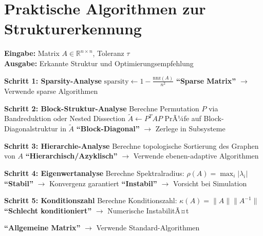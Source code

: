 ﻿\documentclass[a4paper,12pt]{report}
\theoremstyle{definition}
\begin{document}
	\section{Praktische Algorithmen zur Strukturerkennung}
	
	\begin{algorithm}[H]
		\caption{Automatische Strukturerkennung}
		\label{alg:structure-detection}
		\textbf{Eingabe:} Matrix $A \in \mathbb{R}^{n \times n}$, Toleranz $\tau$ \\
		\textbf{Ausgabe:} Erkannte Struktur und Optimierungsempfehlung
		\begin{algorithmic}[1]
			\State \textbf{Schritt 1: Sparsity-Analyse}
			\State $\text{sparsity} \gets 1 - \frac{\text{nnz}(A)}{n^2}$
			\State \Return \textbf{``Sparse Matrix''} $\rightarrow$ Verwende sparse Algorithmen
			\EndIf
			
			\State \textbf{Schritt 2: Block-Struktur-Analyse}
			\State Berechne Permutation $P$ via Bandreduktion oder Nested Dissection
			\State $\tilde{A} \gets P^T A P$
			\State PrÃ¼fe auf Block-Diagonalstruktur in $\tilde{A}$
			\State \Return \textbf{``Block-Diagonal''} $\rightarrow$ Zerlege in Subsysteme
			\EndIf
			
			\State \textbf{Schritt 3: Hierarchie-Analyse}
			\State Berechne topologische Sortierung des Graphen von $A$
			\State \Return \textbf{``Hierarchisch/Azyklisch''} $\rightarrow$ Verwende ebenen-adaptive Algorithmen
			\EndIf
			
			\State \textbf{Schritt 4: Eigenwertanalyse}
			\State Berechne Spektralradius: $\rho(A) = \max_i |\lambda_i|$
			\State \Return \textbf{``Stabil''} $\rightarrow$ Konvergenz garantiert
			\Else
			\State \Return \textbf{``Instabil''} $\rightarrow$ Vorsicht bei Simulation
			\EndIf
			
			\State \textbf{Schritt 5: Konditionszahl}
			\State Berechne Konditionszahl: $\kappa(A) = \|A\| \|A^{-1}\|$
			\State \Return \textbf{``Schlecht konditioniert''} $\rightarrow$ Numerische InstabilitÃ¤t
			\EndIf
			
			\State \Return \textbf{``Allgemeine Matrix''} $\rightarrow$ Verwende Standard-Algorithmen
		\end{algorithmic}
	\end{algorithm}
	
\end{document}
